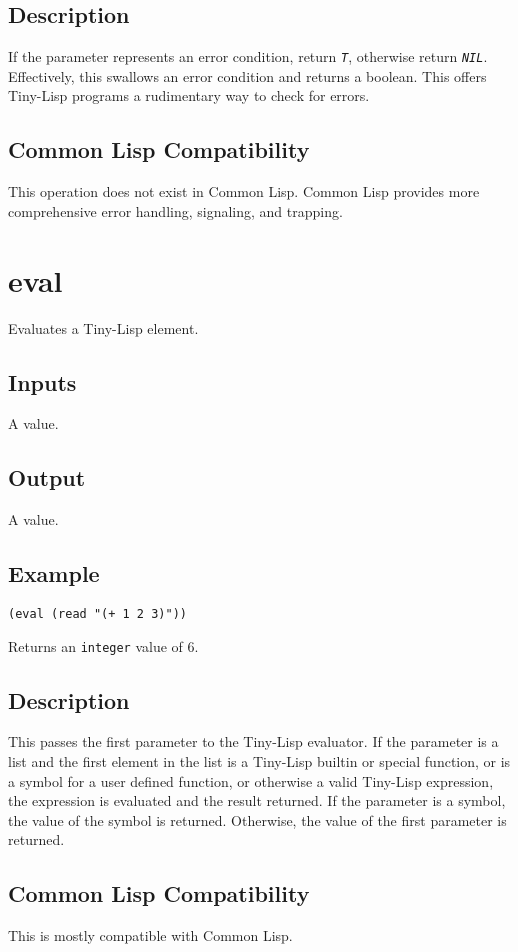 \documentclass[10pt, openany]{book}
\newcommand{\constant}[1]{\emph{\texttt{#1}}}
\newcommand{\datatype}[1]{\texttt{#1}}
\newcommand{\tl}{Tiny-Lisp}
\newcommand{\cl}{Common Lisp}
\begin{document}
\subsection{Description}
If the parameter represents an error condition, return \constant{T}, otherwise return \constant{NIL}.  Effectively, this swallows an error condition and returns a boolean.  This offers \tl{} programs a rudimentary way to check for errors.
\subsection{Common Lisp Compatibility}
This operation does not exist in \cl.  \cl{} provides more comprehensive error handling, signaling, and trapping.

\section{eval}
Evaluates a \tl{} element.
\subsection{Inputs}
A value.
\subsection{Output}
A value.
\subsection{Example}
\begin{lstlisting}
(eval (read "(+ 1 2 3)"))
\end{lstlisting}
Returns an \datatype{integer} value of 6.
\subsection{Description}
This passes the first parameter to the \tl{} evaluator.  If the parameter is a list and the first element in the list is a \tl{} builtin or special function, or is a symbol for a user defined function, or otherwise a valid \tl{} expression, the expression is evaluated and the result returned.  If the parameter is a symbol, the value of the symbol is returned.  Otherwise, the value of the first parameter is returned.
\subsection{Common Lisp Compatibility}
This is mostly compatible with \cl.
\end{document}

